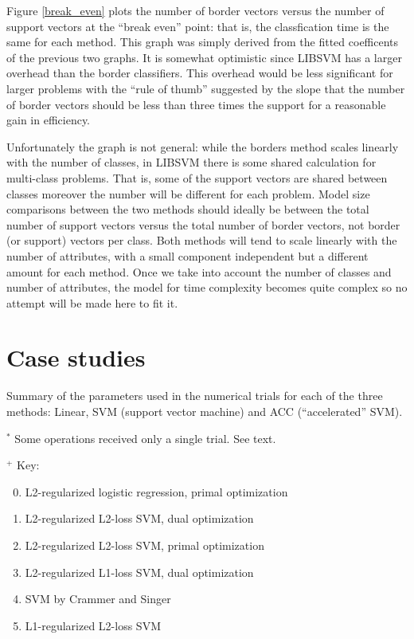 Figure \ref{break_even} plots the number of border vectors versus the number
of support vectors at the ``break even'' point: that is, the classfication
time is the same for each method.
This graph was simply derived from the fitted coefficents of the previous
two graphs.
It is somewhat optimistic
since LIBSVM has a larger overhead than the border classifiers.
This overhead would be less significant for larger problems 
with the ``rule of thumb'' suggested by the slope 
that the number of border vectors should be less than three times the support
for a reasonable gain in efficiency.

Unfortunately the graph is not general: while the borders method scales linearly with
the number of classes, in LIBSVM there is some shared calculation for multi-class problems.
That is, some of the support vectors are shared between classes moreover the number will be different for each problem.
Model size comparisons between the two methods should ideally be between the total 
number of support vectors versus the total number of border vectors, not border (or support) vectors per class.
Both methods will tend to scale linearly with the number of attributes, with a small
component independent but a different amount for each method.
Once we take into account the number of classes and number of attributes, the
model for time complexity becomes quite complex so no attempt will be made here
to fit it.

\section{Case studies}

\label{results_section}

\begin{table}
	\caption{Summary of the parameters used in the numerical trials for each of the three methods: Linear, SVM (support vector machine) and ACC (``accelerated'' SVM).}
	\label{param}
	
	\vspace{1 ex}

	\raggedright 
	$^*$ Some operations received only a single trial. See text.

	$^+$ Key:\citep{Fan_etal2008}
	\begin{enumerate}
			\setcounter{enumi}{-1}
		\item L2-regularized logistic regression, primal optimization
		\item L2-regularized L2-loss SVM, dual optimization
		\item L2-regularized L2-loss SVM, primal optimization
		\item L2-regularized L1-loss SVM, dual optimization
		\item SVM by Crammer and Singer \citep{Crammer_Singer2002}
		\item L1-regularized L2-loss SVM
	\end{enumerate}
\end{table}


